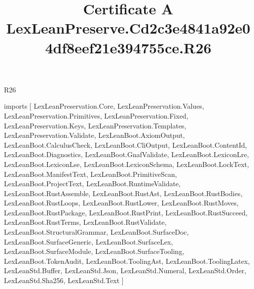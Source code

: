 \begin{lexlean}{R26}
\title{Certificate A LexLeanPreserve.Cd2c3e4841a92e04df8eef21e394755ce.R26}
\begin{coremodule}
imports [
  LexLeanPreservation.Core,
  LexLeanPreservation.Values,
  LexLeanPreservation.Primitives,
  LexLeanPreservation.Fixed,
  LexLeanPreservation.Keys,
  LexLeanPreservation.Templates,
  LexLeanPreservation.Validate,
  LexLeanBoot.AxiomOutput,
  LexLeanBoot.CalculusCheck,
  LexLeanBoot.CliOutput,
  LexLeanBoot.ContentId,
  LexLeanBoot.Diagnostics,
  LexLeanBoot.GnafValidate,
  LexLeanBoot.LexiconLre,
  LexLeanBoot.LexiconLse,
  LexLeanBoot.LexiconSchema,
  LexLeanBoot.LockText,
  LexLeanBoot.ManifestText,
  LexLeanBoot.PrimitiveScan,
  LexLeanBoot.ProjectText,
  LexLeanBoot.RuntimeValidate,
  LexLeanBoot.RustAssemble,
  LexLeanBoot.RustAst,
  LexLeanBoot.RustBodies,
  LexLeanBoot.RustLoops,
  LexLeanBoot.RustLower,
  LexLeanBoot.RustMoves,
  LexLeanBoot.RustPackage,
  LexLeanBoot.RustPrint,
  LexLeanBoot.RustSucceed,
  LexLeanBoot.RustTerms,
  LexLeanBoot.RustValidate,
  LexLeanBoot.StructuralGrammar,
  LexLeanBoot.SurfaceDoc,
  LexLeanBoot.SurfaceGeneric,
  LexLeanBoot.SurfaceLex,
  LexLeanBoot.SurfaceModule,
  LexLeanBoot.SurfaceTooling,
  LexLeanBoot.TokenAudit,
  LexLeanBoot.ToolingAst,
  LexLeanBoot.ToolingLatex,
  LexLeanStd.Buffer,
  LexLeanStd.Json,
  LexLeanStd.Numeral,
  LexLeanStd.Order,
  LexLeanStd.Sha256,
  LexLeanStd.Text
]


\end{coremodule}
\end{lexlean}
